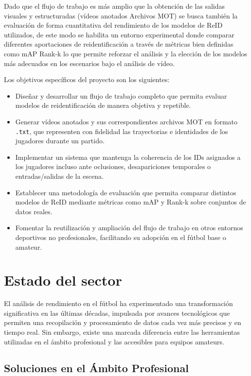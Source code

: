 \documentclass[12pt, a4paper, twoside]{article}
\begin{document}
	Dado que el flujo de trabajo es más amplio que la obtención de las salidas visuales y estructuradas (vídeos anotados Archivos MOT) se busca también la evaluación de forma cuantitativa del rendimiento de los modelos de ReID utilizados, de este modo se habilita un entorno experimental donde comparar diferentes aportaciones de reidentificación a través de métricas bien definidas como mAP Rank-k lo que permite reforzar el análisis y la elección de los modelos más adecuados en los escenarios bajo el análisis de vídeo.
	
	Los objetivos específicos del proyecto son los siguientes:
	
	\begin{itemize}
		\item Diseñar y desarrollar un flujo de trabajo completo que permita evaluar modelos de reidentificación de manera objetiva y repetible.
		\item Generar vídeos anotados y sus correspondientes archivos MOT en formato \texttt{.txt}, que representen con fidelidad las trayectorias e identidades de los jugadores durante un partido.
		\item Implementar un sistema que mantenga la coherencia de los IDs asignados a los jugadores incluso ante oclusiones, desapariciones temporales o entradas/salidas de la escena.
		\item Establecer una metodología de evaluación que permita comparar distintos modelos de ReID mediante métricas como mAP y Rank-k sobre conjuntos de datos reales.
		\item Fomentar la reutilización y ampliación del flujo de trabajo en otros entornos deportivos no profesionales, facilitando su adopción en el fútbol base o amateur.
	\end{itemize}

	
	\section{Estado del sector}
	
	El análisis de rendimiento en el fútbol ha experimentado una transformación significativa en las últimas décadas, impulsada por avances tecnológicos que permiten una recopilación y procesamiento de datos cada vez más precisos y en tiempo real. Sin embargo, existe una marcada diferencia entre las herramientas utilizadas en el ámbito profesional y las accesibles para equipos amateurs.
	
	\subsection{Soluciones en el Ámbito Profesional}
	
\end{document}
